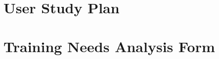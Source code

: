 \documentclass{mproj}
\begin{document}
\section{User Study Plan}
\label{appendix:usertrial}


\section{Training Needs Analysis Form}
\label{sec:traininglog}

%


\newpage


\end{document}

